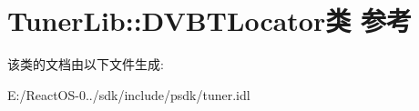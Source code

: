 \hypertarget{class_tuner_lib_1_1_d_v_b_t_locator}{}\section{Tuner\+Lib\+:\+:D\+V\+B\+T\+Locator类 参考}
\label{class_tuner_lib_1_1_d_v_b_t_locator}


该类的文档由以下文件生成\+:\begin{DoxyCompactItemize}
\item 
E\+:/\+React\+O\+S-\/0../sdk/include/psdk/tuner.\+idl\end{DoxyCompactItemize}
